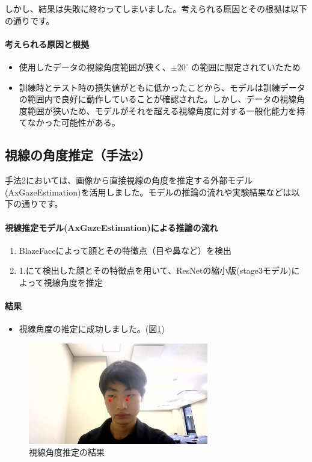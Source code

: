しかし、結果は失敗に終わってしまいました。考えられる原因とその根拠は以下の通りです。

\paragraph{考えられる原因と根拠}
\begin{itemize}
    \item 使用したデータの視線角度範囲が狭く、$\pm 20^\circ$ の範囲に限定されていたため
    \item 訓練時とテスト時の損失値がともに低かったことから、モデルは訓練データの範囲内で良好に動作していることが確認された。しかし、データの視線角度範囲が狭いため、モデルがそれを超える視線角度に対する一般化能力を持てなかった可能性がある。
\end{itemize}

\subsection{視線の角度推定（手法2）}
手法2においては、画像から直接視線の角度を推定する外部モデル(AxGazeEstimation)を活用しました。モデルの推論の流れや実験結果などは以下の通りです。

\paragraph{視線推定モデル(AxGazeEstimation)による推論の流れ}
\begin{enumerate}
    \item BlazeFace\cite{bazarevsky2019blazeface}によって顔とその特徴点（目や鼻など）を検出
    \item 1.にて検出した顔とその特徴点を用いて、ResNetの縮小版(stage3モデル)によって視線角度を推定
\end{enumerate}

\paragraph{結果}
\begin{itemize}
    \item 視線角度の推定に成功しました。(図\ref{fig:gaze_direction_estimation_success})
\end{itemize}

\begin{figure}[htbp]
    \centering
    \includegraphics[width=0.7\textwidth]{eye-track-cursor/fig/gaze_direction_result.png}
    \caption{視線角度推定の結果}
    \label{fig:gaze_direction_estimation_success}
\end{figure}

